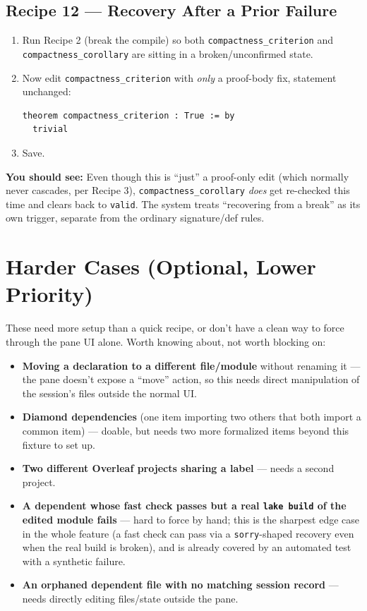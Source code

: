 \documentclass[11pt]{article}
\newcommand{\code}[1]{\texttt{#1}}
\newcommand{\see}[1]{\textbf{You should see:} #1}
\begin{document}
\subsection*{Recipe 12 --- Recovery After a Prior Failure}
\begin{enumerate}[label=\arabic*.]
  \item Run Recipe 2 (break the compile) so both
    \code{compactness\_criterion} and \code{compactness\_corollary} are
    sitting in a broken/unconfirmed state.
  \item Now edit \code{compactness\_criterion} with \emph{only} a proof-body
    fix, statement unchanged:
\begin{verbatim}
theorem compactness_criterion : True := by
  trivial
\end{verbatim}
  \item Save.
\end{enumerate}
\see{Even though this is ``just'' a proof-only edit (which normally never
cascades, per Recipe 3), \code{compactness\_corollary} \emph{does} get
re-checked this time and clears back to \code{valid}. The system treats
``recovering from a break'' as its own trigger, separate from the ordinary
signature/def rules.}

\section{Harder Cases (Optional, Lower Priority)}
These need more setup than a quick recipe, or don't have a clean way to force
through the pane UI alone. Worth knowing about, not worth blocking on:
\begin{itemize}
  \item \textbf{Moving a declaration to a different file/module} without
    renaming it --- the pane doesn't expose a ``move'' action, so this needs
    direct manipulation of the session's files outside the normal UI.
  \item \textbf{Diamond dependencies} (one item importing two others that
    both import a common item) --- doable, but needs two more formalized
    items beyond this fixture to set up.
  \item \textbf{Two different Overleaf projects sharing a label} --- needs a
    second project.
  \item \textbf{A dependent whose fast check passes but a real
    \code{lake build} of the edited module fails} --- hard to force by hand;
    this is the sharpest edge case in the whole feature (a fast check can
    pass via a \code{sorry}-shaped recovery even when the real build is
    broken), and is already covered by an automated test with a synthetic
    failure.
  \item \textbf{An orphaned dependent file with no matching session record}
    --- needs directly editing files/state outside the pane.
\end{itemize}
\end{document}
